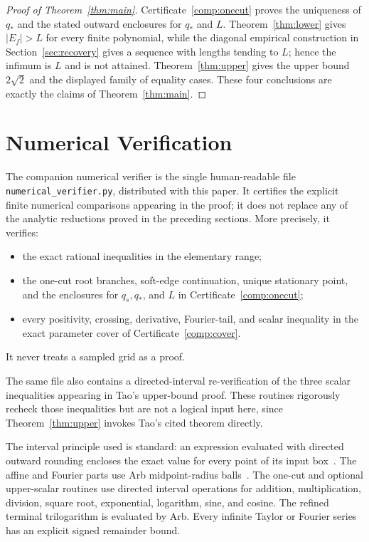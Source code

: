 \documentclass[11pt]{article}
\numberwithin{equation}{section}
\theoremstyle{plain}
\theoremstyle{definition}
\theoremstyle{remark}
\newcommand{\1}{\mathbf 1}
\begin{document}
\begin{proof}[Proof of Theorem~\ref{thm:main}]
Certificate~\ref{comp:onecut} proves the uniqueness of $q_*$ and the stated
outward enclosures for $q_*$ and $L$.  Theorem~\ref{thm:lower} gives
$|E_f|>L$ for every finite polynomial, while the diagonal empirical
construction in Section~\ref{sec:recovery} gives a sequence with lengths
tending to $L$; hence the infimum is $L$ and is not attained.
Theorem~\ref{thm:upper} gives the upper bound $2\sqrt2$ and the displayed
family of equality cases.  These four conclusions are exactly the claims
of Theorem~\ref{thm:main}.
\end{proof}

\appendix
\section{Numerical Verification}\label{app:verification}

The companion numerical verifier is the single human-readable file
\texttt{numerical\_verifier.py}, distributed with this paper.  It certifies
the explicit finite numerical comparisons appearing in the proof; it does
not replace any of the analytic reductions proved in the preceding sections.
More precisely, it verifies:
\begin{itemize}
\item the exact rational inequalities in the elementary range;
\item the one-cut root branches, soft-edge continuation, unique stationary
      point, and the enclosures for $q_s,q_*$, and $L$ in
      Certificate~\ref{comp:onecut};
\item every positivity, crossing, derivative, Fourier-tail, and scalar
      inequality in the exact parameter cover of
      Certificate~\ref{comp:cover}.
\end{itemize}
It never treats a sampled grid as a proof.

The same file also contains a directed-interval re-verification of the three
scalar inequalities appearing in Tao's upper-bound proof.  These routines
rigorously recheck those inequalities but are not a logical input here,
since Theorem~\ref{thm:upper} invokes Tao's cited theorem directly.

The interval principle used is standard: an expression evaluated with
directed outward rounding encloses the exact value for every point of its
input box~\cite{MooreKearfottCloud2009}.  The affine and Fourier parts use
Arb midpoint-radius balls~\cite{Johansson2017}.  The one-cut and optional
upper-scalar routines use directed interval operations for addition, multiplication,
division, square root, exponential, logarithm, sine, and cosine.  The
refined terminal trilogarithm is evaluated by Arb.  Every infinite Taylor
or Fourier series has an explicit signed remainder bound.
\end{document}
